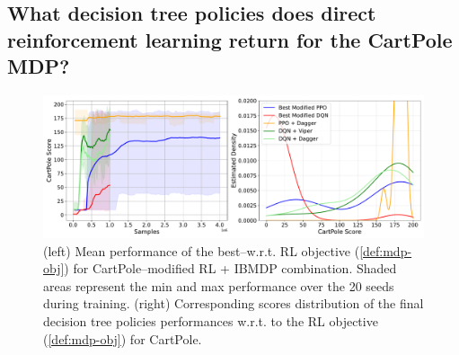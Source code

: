 \subsection{What decision tree policies does direct reinforcement learning return for the CartPole MDP?}

\begin{figure}
    \centering
    \includegraphics[width=1\textwidth]{images/images_part1/ppo_tree_study.pdf}
    \caption{(left) Mean performance of the best--w.r.t. RL objective (\ref{def:mdp-obj}) for CartPole--modified RL + IBMDP combination. Shaded areas represent the min and max performance over the 20 seeds during training. (right) Corresponding scores distribution of the final decision tree policies performances w.r.t. to the RL objective (\ref{def:mdp-obj}) for CartPole.}\label{fig:ppo-trees}
\end{figure}


